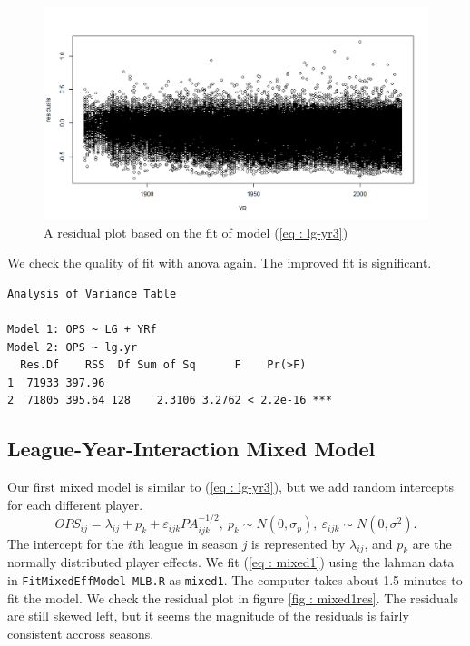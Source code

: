 \documentclass [52pt] {article}
\begin{document}
\begin{figure}[h!]
\centering
\includegraphics[scale = 0.5]{lg-yr_add-res3.png}
\caption{\label{fig : lg-yr3res} A residual plot based on the fit of model (\ref{eq : lg-yr3})}
\end{figure}
We check the quality of fit with anova again.  The improved fit is significant.
\begin{verbatim}
Analysis of Variance Table

Model 1: OPS ~ LG + YRf
Model 2: OPS ~ lg.yr
  Res.Df    RSS  Df Sum of Sq      F    Pr(>F)    
1  71933 397.96                                   
2  71805 395.64 128    2.3106 3.2762 < 2.2e-16 ***
\end{verbatim}

\subsection{League-Year-Interaction Mixed Model}
Our first mixed model is similar to (\ref{eq : lg-yr3}), but we add random intercepts for each different player.  
\begin{equation}\label{eq : mixed1}
OPS_{ij} = \lambda_{ij} + p_k + \varepsilon_{ijk} PA_{ijk}^{-1/2},\:p_k\sim N(0,\sigma_p),\: \varepsilon_{ijk}\sim N(0,\sigma^2).
\end{equation}
The intercept for the $i$th league in season $j$ is represented by $\lambda_{ij}$, and $p_k$ are the normally distributed player effects.  We fit (\ref{eq : mixed1}) using the lahman data in \verb|FitMixedEffModel-MLB.R| as \verb|mixed1|.  The computer takes about 1.5 minutes to fit the model.  We check the residual plot in figure \ref{fig : mixed1res}.  The residuals are still skewed left, but it seems the magnitude of the residuals is fairly consistent accross seasons.
\end{document}
